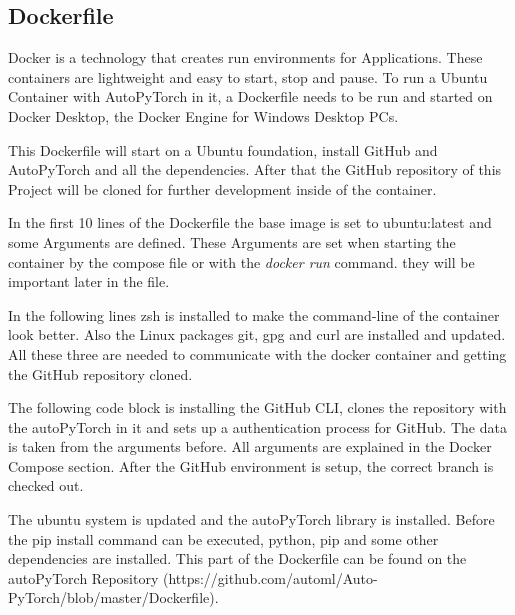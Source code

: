 \documentclass[a4paper, 12pt, oneside]{scrbook}
\begin{document}
		\subsection{Dockerfile}
		
		\noindent Docker is a technology that creates run environments for Applications. These containers are lightweight and easy to start, stop and pause. To run a Ubuntu Container with AutoPyTorch in it, a Dockerfile needs to be run and started on Docker Desktop, the Docker Engine for Windows Desktop PCs.
		
		\noindent This Dockerfile will start on a Ubuntu foundation, install GitHub and AutoPyTorch and all the dependencies. After that the GitHub repository of this Project will be cloned for further development inside of the container. 
		
		\noindent In the first 10 lines of the Dockerfile the base image is set to ubuntu:latest and some Arguments are defined. These Arguments are set when starting the container by the compose file or with the \textit{docker run} command. they will be important later in the file. 
		
		
		\noindent 
		
		\noindent In the following lines zsh is installed to make the command-line of the container look better. Also the Linux packages git, gpg and curl are installed and updated. All these three are needed to communicate with the docker container and getting the GitHub repository cloned.
		
		\noindent 
		
		\noindent The following code block is installing the GitHub CLI, clones the repository with the autoPyTorch in it and sets up a authentication process for GitHub. The data is taken from the arguments before. All arguments are explained in the Docker Compose section. After the GitHub environment is setup, the correct branch is checked out. 
		
		\noindent 
		
		\noindent The ubuntu system is updated and the autoPyTorch library is installed. Before the pip install command can be executed, python, pip and some other dependencies are installed. This part of the Dockerfile can be found on the autoPyTorch Repository (https://github.com/automl/Auto-PyTorch/blob/master/Dockerfile). 
		
\end{document}

